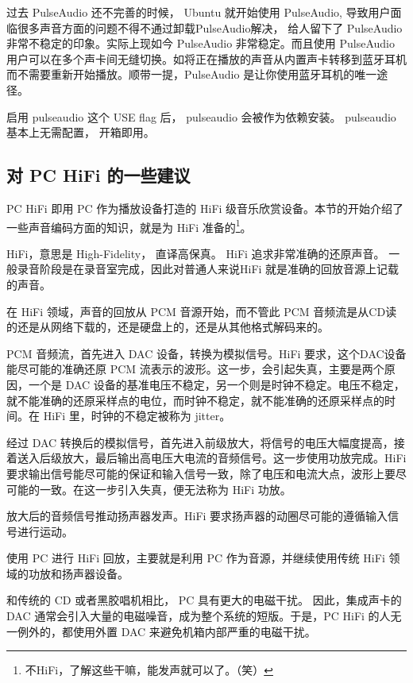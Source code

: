 过去 PulseAudio 还不完善的时候， Ubuntu 就开始使用 PulseAudio,  导致用户面临很多声音方面的问题不得不通过卸载PulseAudio解决，
给人留下了 PulseAudio 非常不稳定的印象。实际上现如今 PulseAudio 非常稳定。而且使用 PulseAudio 用户可以在多个声卡间无缝切换。如将正在播放的声音从内置声卡转移到蓝牙耳机而不需要重新开始播放。顺带一提，PulseAudio 是让你使用蓝牙耳机的唯一途径。

启用 pulseaudio 这个 USE flag 后， pulseaudio 会被作为依赖安装。
pulseaudio 基本上无需配置， 开箱即用。

\subsection{对 PC HiFi 的一些建议}

PC HiFi 即用 PC 作为播放设备打造的 HiFi 级音乐欣赏设备。本节的开始介绍了一些声音编码方面的知识，就是为 HiFi 准备的\footnote{不HiFi，了解这些干嘛，能发声就可以了。（笑）}。

HiFi，意思是 High-Fidelity， 直译高保真。 HiFi 追求非常准确的还原声音。 一般录音阶段是在录音室完成，因此对普通人来说HiFi 就是准确的回放音源上记载的声音。

在 HiFi 领域，声音的回放从 PCM 音源开始，而不管此 PCM 音频流是从CD读的还是从网络下载的，还是硬盘上的，还是从其他格式解码来的。

\begin{list}{\textbullet}{}
\item PCM 音频流，首先进入 DAC 设备，转换为模拟信号。HiFi 要求，这个DAC设备能尽可能的准确还原 PCM 流表示的波形。这一步，会引起失真，主要是两个原因，一个是 DAC 设备的基准电压不稳定，另一个则是时钟不稳定。电压不稳定，就不能准确的还原采样点的电位，而时钟不稳定，就不能准确的还原采样点的时间。在 HiFi 里，时钟的不稳定被称为 jitter。

\item 经过 DAC 转换后的模拟信号，首先进入前级放大，将信号的电压大幅度提高，接着送入后级放大，最后输出高电压大电流的音频信号。这一步使用功放完成。HiFi要求输出信号能尽可能的保证和输入信号一致，除了电压和电流大点，波形上要尽可能的一致。在这一步引入失真，便无法称为 HiFi 功放。

\item 放大后的音频信号推动扬声器发声。HiFi 要求扬声器的动圈尽可能的遵循输入信号进行运动。

\end{list}

使用 PC 进行 HiFi 回放，主要就是利用 PC 作为音源，并继续使用传统 HiFi 领域的功放和扬声器设备。

和传统的 CD 或者黑胶唱机相比， PC 具有更大的电磁干扰。 因此，集成声卡的 DAC 通常会引入大量的电磁噪音，成为整个系统的短版。于是，PC HiFi 的人无一例外的，都使用外置 DAC 来避免机箱内部严重的电磁干扰。

